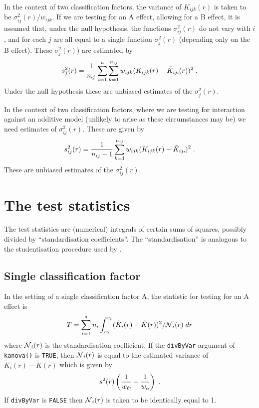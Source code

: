 \documentclass[12pt]{article}
\newcommand{\pt}{\mbox{\scalebox{0.4}{$\bullet$}}}
\newcommand{\sco}{\mbox{$\cal N$}}
\begin{document}
In the context of two classification factors, the variance of
$K_{ijk}(r)$ is taken to be $\sigma_{ij}^2(r)/w_{ijk}$.  If we
are testing for an A effect, allowing for a B effect, it is assumed
that, under the null hypothesis, the functions $\sigma_{ij}^2(r)$
do not vary with $i$, and for each $j$ are all equal to a single
function $\sigma_j^2(r)$ (depending only on the B effect).  These
$\sigma^2_j(r)$) are estimated by
\[
s^2_j(r) = \frac{1}{n_{\pt j}} \sum_{i=1}^a \sum_{k=1}^{n_{ij}}
                               w_{ijk}(K_{ijk}(r) - \tilde{K}_{ij\pt}(r))^2 \; .
\]
Under the null hypothesis these are unbiased estimates of the $\sigma^2_j(r)$.

In the context of two classification factors, where we are testing for
interaction against an additive model (unlikely to arise as these circumstances
may be) we need estimates of $\sigma^2_{ij}(r)$.  These are given by
\[
s^2_{ij}(r) = \frac{1}{n_{ij} - 1} \sum_{k=1}^{n_{ij}} w_{ijk}(K_{ijk}(r)
                                            - \tilde{K}_{ij\pt})^2 \; .
\]
These are unbiased estimates of the $\sigma^2_{ij}(r)$.

\section{The test statistics}
\label{sec:teststats}

The test statistics are (numerical) integrals of certain sums
of squares, possibly divided by ``standardisation coefficients''.
The ``standardisation'' is analogous to the studentisation procedure
used by \cite{Hahn2012}.

\subsection{Single classification factor}
\label{sec:teststats.scf}

In the setting of a single classification factor A, the statistic
for testing for an A effect is
\[
T = \sum_{i=1}^a n_i \int_{r_0}^{r_1} (\tilde{K}_i(r) - 
                 \tilde{K}(r))^2/\sco_i(r) \; dr
\]
where $\sco_i(r)$ is the standardisation coefficient.  If the
\texttt{divByVar} argument of \texttt{kanova()} is \texttt{TRUE},
then $\sco_i(r)$ is equal to the estimated variance of $\tilde{K}_i(r)
- \tilde{K}(r)$ which is given by
\[
s^2(r) \left ( \frac{1}{w_\ell \pt} - \frac{1}{w_{\pt \pt}} \right ) \; .
\]
If \texttt{divByVar} is \texttt{FALSE} then $\sco_i(r)$ is taken to
be identically equal to 1.
\end{document}
